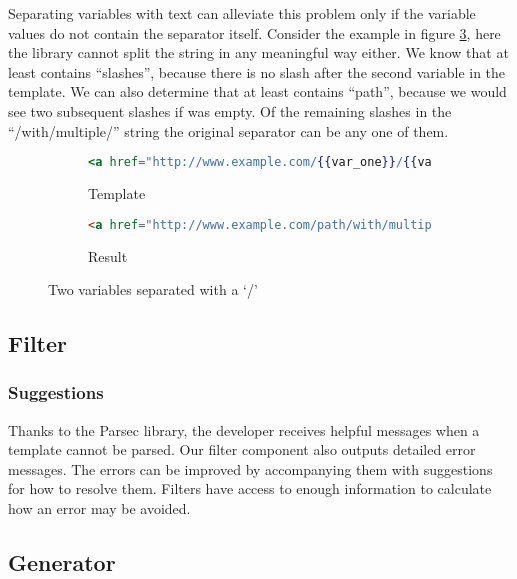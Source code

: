\documentclass[thesis.tex]{subfiles}
\begin{document}
Separating variables with text can alleviate this problem only if the variable
values do not contain the separator itself. Consider the example in figure
\ref{fig:twovars-sep}, here the library cannot split the string in any
meaningful way either. We know that  at least contains
``slashes'', because there is no slash after the second variable in the
template. We can also determine that  at least contains
``path'', because we would see two subsequent slashes if  was
empty. Of the remaining slashes in the ``/with/multiple/'' string the
original separator can be any one of them.
\begin{figure}
	\centering
	\begin{subfigure}{\textwidth}
		\caption{Template}
		\label{fig:twovars-sep.mustache}
		\begin{lstlisting}[language=mustache]
<a href="http://www.example.com/{{var_one}}/{{var_two}</a>
		\end{lstlisting}
	\end{subfigure}
	
	\begin{subfigure}{\textwidth}
		\caption{Result}
		\label{fig:twovars-sep.html}
		\begin{lstlisting}[language=HTML]
<a href="http://www.example.com/path/with/multiple/slashes</a>
		\end{lstlisting}
	\end{subfigure}
	\caption{Two variables separated with a `/'}
	\label{fig:twovars-sep}
\end{figure}

\subsection{Filter}

\subsubsection{Suggestions}
Thanks to the Parsec library, the developer receives helpful messages when a
template cannot be parsed. Our filter component also outputs detailed error
messages. The errors can be improved by accompanying them with suggestions for
how to resolve them. Filters have access to enough information to calculate how
an error may be avoided.

\subsection{Generator}
\end{document}
